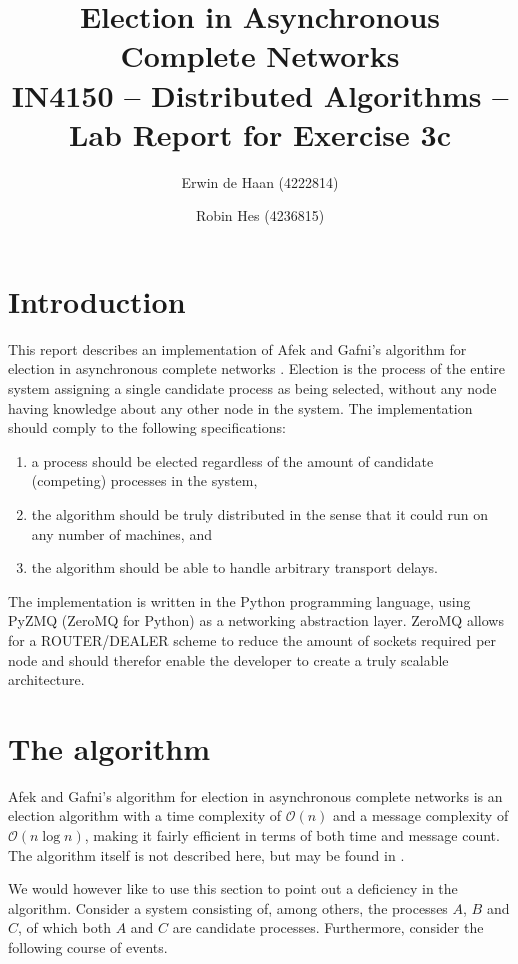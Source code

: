\documentclass{article}
\title{Election in Asynchronous Complete Networks\\{\large IN4150 -- Distributed Algorithms -- Lab Report for Exercise 3c}}
\author{Erwin de Haan (4222814) \and Robin Hes (4236815)}
\begin{document}
\maketitle

\section{Introduction}
This report describes an implementation of Afek and Gafni's algorithm for election in asynchronous complete networks \cite{afek1985time}. Election is the process of the entire system assigning a single candidate process as being selected, without any node having knowledge about any other node in the system. The implementation should comply to the following specifications:

\begin{enumerate}
	\item a process should be elected regardless of the amount of candidate (competing) processes in the system,
	\item the algorithm should be truly distributed in the sense that it could run on any number of machines, and
	\item the algorithm should be able to handle arbitrary transport delays.
\end{enumerate}

The implementation is written in the Python programming language, using PyZMQ (ZeroMQ for Python) as a networking abstraction layer. ZeroMQ allows for a ROUTER/DEALER scheme to reduce the amount of sockets required per node and should therefor enable the developer to create a truly scalable architecture.

\section{The algorithm}
Afek and Gafni's algorithm for election in asynchronous complete networks is an election algorithm with a time complexity of $\mathcal{O}(n)$ and a message complexity of $\mathcal{O}(n\log n)$, making it fairly efficient in terms of both time and message count. The algorithm itself is not described here, but may be found in \cite[p.12]{afek1985time}.

We would however like to use this section to point out a deficiency in the algorithm. Consider a system consisting of, among others, the processes $A$, $B$ and $C$, of which both $A$ and $C$ are candidate processes. Furthermore, consider the following course of events.
\end{document}
